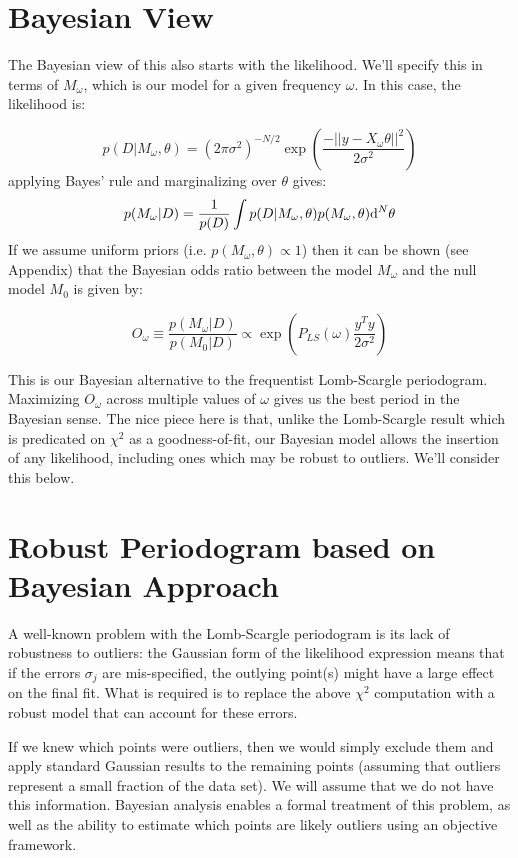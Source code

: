\documentclass[12pt,pdftex]{article}
\begin{document}
\section{Bayesian View}
The Bayesian view of this also starts with the likelihood.
We'll specify this in terms of $M_\omega$, which is our model for a given frequency $\omega$. In this case, the likelihood is:

\begin{equation}
  p(D|M_\omega,\theta) =
  (2\pi\sigma^2)^{-N/2} \exp\left(
  \frac{-||y - X_\omega\theta||^2}{2\sigma^2}
  \right)
\end{equation}
applying Bayes' rule and marginalizing over $\theta$ gives:
\begin{equation}
  p(M_\omega|D) = \frac{1}{p(D)}\int p(D|M_\omega,\theta)p(M_\omega, \theta){\rm d}^N\theta
\end{equation}
If we assume uniform priors (i.e. $p(M_\omega, \theta) \propto 1$) then it can be shown (see Appendix) that the Bayesian odds ratio between the model $M_\omega$ and the null model $M_0$ is given by:

\begin{equation}
  O_\omega \equiv \frac{p(M_\omega|D)}{p(M_0|D)} \propto \exp\left(P_{LS}(\omega)\frac{y^Ty}{2\sigma^2}\right)
\end{equation}

This is our Bayesian alternative to the frequentist Lomb-Scargle periodogram.
Maximizing $O_\omega$ across multiple values of $\omega$ gives us the best period in the Bayesian sense.
The nice piece here is that, unlike the Lomb-Scargle result which is predicated on $\chi^2$ as a goodness-of-fit, our Bayesian model allows the insertion of any likelihood, including ones which may be robust to outliers. We'll consider this below.

\section{Robust Periodogram based on Bayesian Approach}

A well-known problem with the Lomb-Scargle periodogram is its lack of robustness to outliers: the Gaussian form of the likelihood expression means that if the errors $\sigma_j$ are mis-specified, the outlying point(s) might have a large effect on the final fit. 
What is required is to replace the above $\chi^2$ computation with a robust model that can account for these errors.

If we knew which points were outliers, then we would simply exclude them and
apply standard Gaussian results to the remaining points (assuming that outliers
represent a small fraction of the data set). We will assume that we do not have this
information. Bayesian analysis enables a formal treatment of this problem, as well 
as the ability to estimate which points are likely outliers using an objective framework.
\end{document}
